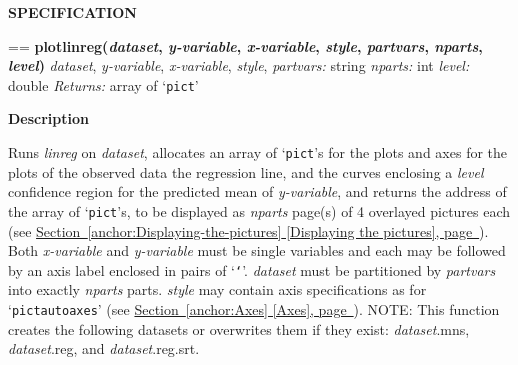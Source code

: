 \documentclass{book}
\makeatletter
\newcommand\Texinfocommandstyletextvar[1]{{\normalfont{}\textsl{#1}}}%
\newenvironment{Texinfopreformatted}{%
  \par\GNUTobeylines\obeyspaces\frenchspacing\parskip=\z@\parindent=\z@}{}
{\catcode`\^^M=13 \gdef\GNUTobeylines{\catcode`\^^M=13 \def^^M{\null\par}}}
\newenvironment{Texinfoindented}{\begin{list}{}{}\item\relax}{\end{list}}
\renewcommand{\_}{\Texinfounderscore\discretionary{}{}{}}
\makeatother
\begin{document}
\noindent{}\textbf{SPECIFICATION}
\begin{Texinfoindented}
\begin{Texinfopreformatted}%
\textbf{plotlinreg(\Texinfocommandstyletextvar{dataset}, \Texinfocommandstyletextvar{y-variable}, \Texinfocommandstyletextvar{x-variable}, \Texinfocommandstyletextvar{style}, \Texinfocommandstyletextvar{partvars}, \Texinfocommandstyletextvar{nparts}, \Texinfocommandstyletextvar{level})}
\Texinfocommandstyletextvar{dataset}, \Texinfocommandstyletextvar{y-variable}, \Texinfocommandstyletextvar{x-variable}, \Texinfocommandstyletextvar{style}, \Texinfocommandstyletextvar{partvars:} string
\Texinfocommandstyletextvar{nparts:} int
\Texinfocommandstyletextvar{level:} double
\Texinfocommandstyletextvar{Returns:} array of `\texttt{pict}'
\end{Texinfopreformatted}
\end{Texinfoindented}
%
%
%

\noindent{}\textbf{Description}

Runs \Texinfocommandstyletextvar{linreg} on \Texinfocommandstyletextvar{dataset},
allocates an array of `\texttt{pict}'s for the plots and axes for the plots
of the observed data the regression line, and the curves enclosing a
\Texinfocommandstyletextvar{level} confidence region for the predicted mean of
\Texinfocommandstyletextvar{y-variable}, and returns the address of the array of `\texttt{pict}'s,
to be displayed
as \Texinfocommandstyletextvar{nparts} page(s) of 4 overlayed pictures each (see \hyperref[anchor:Displaying-the-pictures]{Section~\ref*{anchor:Displaying-the-pictures} [Displaying the pictures], page~\pageref*{anchor:Displaying-the-pictures}}).
Both \Texinfocommandstyletextvar{x-variable} and \Texinfocommandstyletextvar{y-variable} must be single variables and each
may be followed by an axis label enclosed in pairs of `\texttt{`}'.
\Texinfocommandstyletextvar{dataset} must be partitioned by \Texinfocommandstyletextvar{partvars} into exactly \Texinfocommandstyletextvar{nparts} parts.
\Texinfocommandstyletextvar{style} may contain axis specifications as for `\texttt{pict\_autoaxes}'
(see \hyperref[anchor:Axes]{Section~\ref*{anchor:Axes} [Axes], page~\pageref*{anchor:Axes}}).
NOTE: This function creates the following datasets or overwrites them if they exist:
\Texinfocommandstyletextvar{dataset}.mns, \Texinfocommandstyletextvar{dataset}.reg, and \Texinfocommandstyletextvar{dataset}.reg.srt.
\end{document}
